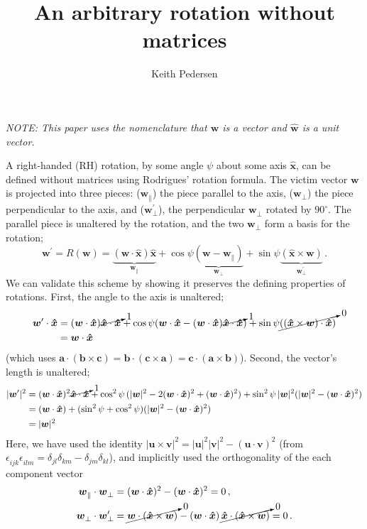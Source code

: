 \documentclass[12pt, nofootinbib, notitlepage]{revtex4-1}
\renewcommand{\vec}[1]{\boldsymbol{#1}}
\newcommand{\vecN}[1]{\vec{\hat{#1}}}
\newcommand{\ds}{^{}}
\newcommand{\abs}[1]{|#1|}
\newcommand{\ang}{\psi}
\newcommand{\vict}{\vec{w}}
\newcommand{\ax}{\vecN{x}}
\begin{document}
\title{An arbitrary rotation without matrices}
\author{Keith Pedersen}

\maketitle

{\it NOTE: This paper uses the nomenclature that $\vec{w}$ is a vector and 
$\vecN{w}$ is a unit vector.}
\medskip

A right-handed (RH) rotation, by some angle $\ang$ about some axis $\ax$, 
can be defined without matrices using Rodrigues' rotation formula.
The victim vector $\vec{w}$ is projected into three pieces:
($\vec{w}_\parallel\ds$) the piece parallel to the axis, 
($\vec{w}_{\bot}\ds$) the piece perpendicular to the axis, 
and ($\vec{w}^\prime_{\bot}$), the perpendicular $\vec{w}_{\bot}\ds$ rotated by $90^\circ$.
The parallel piece is unaltered by the rotation, 
and the two $\vec{w}_{\bot}\ds$ form a basis for the rotation;
\begin{equation}\label{eq:rot}
	\vict^\prime=R(\vict) = \underset{\vec{w}_\parallel\ds}{\underbrace{(\vict\cdot\ax)\ax}} 
		+ \cos\ang\underset{\vec{w}_{\bot}\ds}{\underbrace{(\vict - \vec{w}_\parallel\ds)}}
		+ \sin\ang\underset{\vec{w}^\prime_{\bot}}{\underbrace{(\ax\times\vict)}}
		\,.
\end{equation}
We can validate this scheme by showing it preserves %
the defining properties of rotations. 
First, the angle to the axis is unaltered;
\begin{align}
	\vict^\prime \cdot\ax
	& = (\vict\cdot\ax)\cancelto{1}{\ax\cdot\ax}
	  + \cos\ang(\vict\cdot\ax - (\vict\cdot\ax)\cancelto{1}{\ax\cdot\ax})	
	  + \sin\ang\cancelto{0}{((\ax\times\vict)\cdot\ax)}		\nonumber\\
	& = \vict\cdot\ax
\end{align}
(which uses $\vec{a}\cdot(\vec{b}\times\vec{c}) 
	= \vec{b}\cdot(\vec{c}\times\vec{a}) 
	= \vec{c}\cdot(\vec{a}\times\vec{b})$).
Second, the vector's length is unaltered;
\begin{align}
	\abs{\vict^\prime}^2 
	& = (\vict\cdot\ax)^2\cancelto{1}{\ax\cdot\ax}
	 + \cos^2\ang\,(\abs{\vict}^2 - 2(\vict\cdot\ax)^2 + (\vict\cdot\ax)^2)
	  + \sin^2\ang\,\abs{\vict}^2(\abs{\vict}^2 - (\vict\cdot\vecN{x})^2)	\nonumber\\
	  & = (\vict\cdot\ax) + (\sin^2\ang + \cos^2\ang)(\abs{\vict}^2 - (\vict\cdot\ax)^2)	\nonumber\\
	  & = \abs{\vict}^2
\end{align}
Here, we have used the identity 
$\abs{\vec{u}\times\vec{v}}^2=\abs{\vec{u}}^2\abs{\vec{v}}^2 - (\vec{u}\cdot\vec{v})^2$
(from $\epsilon_{ijk}\ds\epsilon_{ilm}\ds=\delta_{jl}\ds\delta_{km}\ds-\delta_{jm}\ds\delta_{kl}\ds$), 
and implicitly used the orthogonality of the each component vector
\begin{align}
	\vec{w}_\parallel\ds \cdot \vec{w}_\bot\ds
		& =(\vict\cdot\ax)^2 - (\vict\cdot\ax)^2 = 0
	\,,\\
	\vec{w}_\bot\ds \cdot \vec{w}^\prime_\bot
		& = \cancelto{0}{\vec{w}\cdot(\ax\times\vec{w})} 
			- (\vict\cdot\ax)\,\cancelto{0}{\ax\cdot(\ax\times\vec{w})} = 0
	\,.
\end{align}
\end{document}
